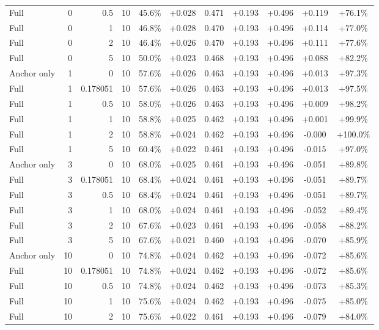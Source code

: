 \begin{table}[htbp]
\begin{tabular}{lrrrccccccc}
Full & 0 & 0.5 & 10 & 45.6\% & +0.028 & 0.471 & +0.193 & +0.496 & +0.119 & +76.1\% \\
Full & 0 & 1 & 10 & 46.8\% & +0.028 & 0.470 & +0.193 & +0.496 & +0.114 & +77.0\% \\
Full & 0 & 2 & 10 & 46.4\% & +0.026 & 0.470 & +0.193 & +0.496 & +0.111 & +77.6\% \\
Full & 0 & 5 & 10 & 50.0\% & +0.023 & 0.468 & +0.193 & +0.496 & +0.088 & +82.2\% \\
Anchor only & 1 & 0 & 10 & 57.6\% & +0.026 & 0.463 & +0.193 & +0.496 & +0.013 & +97.3\% \\
Full & 1 & 0.178051 & 10 & 57.6\% & +0.026 & 0.463 & +0.193 & +0.496 & +0.013 & +97.5\% \\
Full & 1 & 0.5 & 10 & 58.0\% & +0.026 & 0.463 & +0.193 & +0.496 & +0.009 & +98.2\% \\
Full & 1 & 1 & 10 & 58.8\% & +0.025 & 0.462 & +0.193 & +0.496 & +0.001 & +99.9\% \\
Full & 1 & 2 & 10 & 58.8\% & +0.024 & 0.462 & +0.193 & +0.496 & -0.000 & +100.0\% \\
Full & 1 & 5 & 10 & 60.4\% & +0.022 & 0.461 & +0.193 & +0.496 & -0.015 & +97.0\% \\
Anchor only & 3 & 0 & 10 & 68.0\% & +0.025 & 0.461 & +0.193 & +0.496 & -0.051 & +89.8\% \\
Full & 3 & 0.178051 & 10 & 68.4\% & +0.024 & 0.461 & +0.193 & +0.496 & -0.051 & +89.7\% \\
Full & 3 & 0.5 & 10 & 68.4\% & +0.024 & 0.461 & +0.193 & +0.496 & -0.051 & +89.7\% \\
Full & 3 & 1 & 10 & 68.0\% & +0.024 & 0.461 & +0.193 & +0.496 & -0.052 & +89.4\% \\
Full & 3 & 2 & 10 & 67.6\% & +0.023 & 0.461 & +0.193 & +0.496 & -0.058 & +88.2\% \\
Full & 3 & 5 & 10 & 67.6\% & +0.021 & 0.460 & +0.193 & +0.496 & -0.070 & +85.9\% \\
Anchor only & 10 & 0 & 10 & 74.8\% & +0.024 & 0.462 & +0.193 & +0.496 & -0.072 & +85.6\% \\
Full & 10 & 0.178051 & 10 & 74.8\% & +0.024 & 0.462 & +0.193 & +0.496 & -0.072 & +85.6\% \\
Full & 10 & 0.5 & 10 & 74.8\% & +0.024 & 0.462 & +0.193 & +0.496 & -0.073 & +85.3\% \\
Full & 10 & 1 & 10 & 75.6\% & +0.024 & 0.462 & +0.193 & +0.496 & -0.075 & +85.0\% \\
Full & 10 & 2 & 10 & 75.6\% & +0.022 & 0.461 & +0.193 & +0.496 & -0.079 & +84.0\% \\

\end{tabular}
\end{table}
